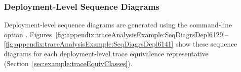 \subsubsection{Deployment-Level Sequence Diagrams}\label{sec:example:deploymentSeqDiagrams}%

Deployment-level sequence diagrams are generated using the command-line option \OPT{\OPTplotDeploymentSequenceDiagrams}. %
Figures~\ref{fig:appendix:traceAnalysisExample:SeqDiagrsDepl6129}--\ref{fig:appendix:traceAnalysisExample:SeqDiagrsDepl6141} %
show these sequence diagrams for each deployment-level %
trace equivalence representative (Section~\ref{sec:example:traceEquivClasses}).

\begin{figure}[h]\centering
{}
\end{figure}
